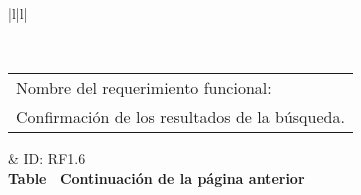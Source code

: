 \begin{longtable}{|l|l|}
\caption{Requerimiento funcional 1.6}
\label{RF1_6}\\
\hline
\begin{tabular}[c]{@{}l@{}}Nombre del requerimiento funcional:\\ Confirmación de los resultados de la búsqueda.\end{tabular}                                                                                                                                                                                                                      & ID: RF1.6                                                                                                                                                                                                                               \\ \hline
\endfirsthead
%
%
{{\bfseries Table \thetable\ Continuación de la página anterior}} \\
\endhead
%
                                                                                                                                                                                                                                                                                                                                                                                                                                                                                                                       \\ \hline
{}                                                                                                                                                                                                                                                                                                                                                                                                                                                                                                                                                   \\ \hline
{}                                                                                                                                                                                                                                                                                                                                                                                                                                                                                                                            \\ \hline

\end{longtable}
